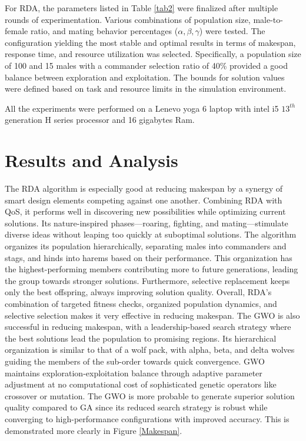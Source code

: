\documentclass[pdflatex,sn-mathphys-num]{sn-jnl}%
\theoremstyle{thmstyleone}%
\theoremstyle{thmstyletwo}%
\theoremstyle{thmstylethree}%
\begin{document}
For RDA, the parameters listed in Table \ref{tab2} were finalized after multiple rounds of experimentation. Various combinations of population size, male-to-female ratio, and mating behavior percentages ($\alpha, \beta, \gamma$) were tested. The configuration yielding the most stable and optimal results in terms of makespan, response time, and resource utilization was selected. Specifically, a population size of 100 and 15 males with a commander selection ratio of 40\% provided a good balance between exploration and exploitation. The bounds for solution values were defined based on task and resource limits in the simulation environment.

All the experiments were performed on a Lenevo yoga 6 laptop with intel i5 $13^{th}$ generation H series processor and 16 gigabytes Ram.

\section{Results and Analysis}\label{sec6}

The RDA algorithm is especially good at reducing makespan by a synergy of smart design elements competing against one another. Combining RDA with QoS, it performs well in discovering new possibilities while optimizing current solutions. Its nature-inspired phases—roaring, fighting, and mating—stimulate diverse ideas without leaping too quickly at suboptimal solutions. The algorithm organizes its population hierarchically, separating males into commanders and stags, and hinds into harems based on their performance. This organization has the highest-performing members contributing more to future generations, leading the group towards stronger solutions. Furthermore, selective replacement keeps only the best offspring, always improving solution quality. Overall, RDA's combination of targeted fitness checks, organized population dynamics, and selective selection makes it very effective in reducing makespan.
The GWO is also successful in reducing makespan, with a leadership-based search strategy where the best solutions lead the population to promising regions. Its hierarchical organization is similar to that of a wolf pack, with alpha, beta, and delta wolves guiding the members of the sub-order towards quick convergence. GWO maintains exploration-exploitation balance through adaptive parameter adjustment at no computational cost of sophisticated genetic operators like crossover or mutation. The GWO is more probable to generate superior solution quality compared to GA since its reduced search strategy is robust while converging to high-performance configurations with improved accuracy.
This is demonstrated more clearly in Figure \ref{Makespan}.
\end{document}
